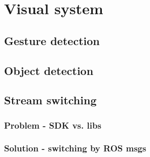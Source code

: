 \chapter{Visual system}

\section{Gesture detection}

\section{Object detection}

\section{Stream switching}

\subsection{Problem - SDK vs. libs}
\subsection{Solution - switching by ROS msgs}